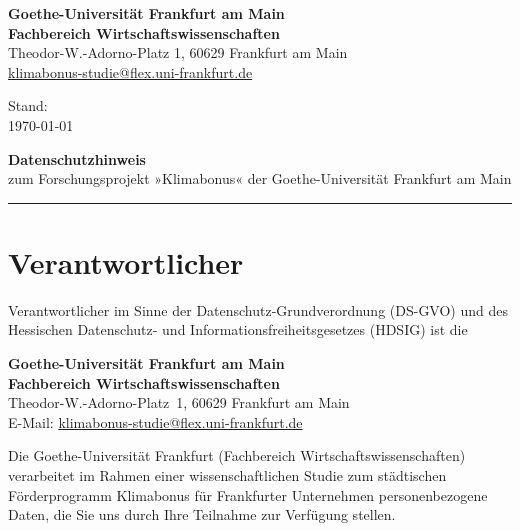 \documentclass[11pt,a4paper,parskip=half,DIV=12]{scrartcl}
\begin{document}
\begin{minipage}[t]{0.7\textwidth}
\vspace{0pt}\raggedright
{\footnotesize\color{gugrey}
\textbf{Goethe-Universität Frankfurt am Main}\\
\textbf{Fachbereich Wirtschaftswissenschaften}\\
Theodor-W.-Adorno-Platz 1, 60629 Frankfurt am Main\\
\href{mailto:klimabonus-studie@flex.uni-frankfurt.de}{klimabonus-studie@flex.uni-frankfurt.de}
}
\end{minipage}\hfill
\begin{minipage}[t]{0.27\textwidth}
\vspace{0pt}\raggedleft
{\footnotesize\color{gugrey}Stand:\\ \today}
\end{minipage}

\vspace{1.4cm}

{\sffamily\fontsize{26pt}{30pt}\selectfont\bfseries\color{gubluedark}Datenschutzhinweis}\\[0.3em]
{\sffamily\large\color{gugrey}zum Forschungsprojekt »Klimabonus« der Goethe-Universität Frankfurt am Main}

\vspace{0.6cm}
{\color{gulightgrey}\rule{\textwidth}{0.6pt}}
\vspace{0.4cm}


\section*{Verantwortlicher}

Verantwortlicher im Sinne der Datenschutz-Grundverordnung (DS-GVO) und des Hessischen Datenschutz- und Informations\-freiheitsgesetzes (HDSIG) ist die

\textbf{Goethe-Universität Frankfurt am Main}\\
\textbf{Fachbereich Wirtschaftswissenschaften}\\
Theodor-W.-Adorno-Platz~1, 60629 Frankfurt am Main\\
E-Mail: \href{mailto:klimabonus-studie@flex.uni-frankfurt.de}{klimabonus-studie@flex.uni-frankfurt.de}

Die Goethe-Universität Frankfurt (Fachbereich Wirtschaftswissenschaften) verarbeitet im Rahmen einer wissenschaftlichen Studie zum städtischen Förderprogramm Klimabonus für Frankfurter Unternehmen personenbezogene Daten, die Sie uns durch Ihre Teilnahme zur Verfügung stellen.
\end{document}
